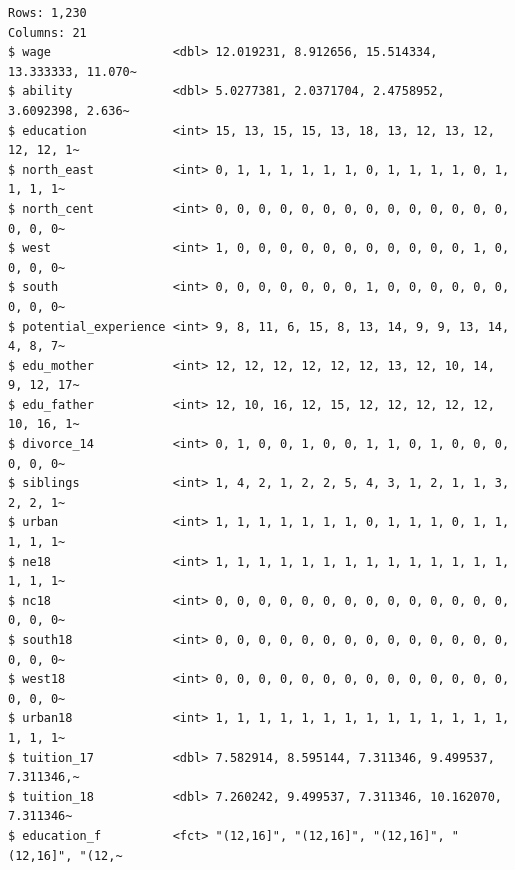 \documentclass[
  letterpaper,
  DIV=11,
  numbers=noendperiod]{scrreprt}
\begin{document}
\begin{verbatim}
Rows: 1,230
Columns: 21
$ wage                 <dbl> 12.019231, 8.912656, 15.514334, 13.333333, 11.070~
$ ability              <dbl> 5.0277381, 2.0371704, 2.4758952, 3.6092398, 2.636~
$ education            <int> 15, 13, 15, 15, 13, 18, 13, 12, 13, 12, 12, 12, 1~
$ north_east           <int> 0, 1, 1, 1, 1, 1, 1, 0, 1, 1, 1, 1, 0, 1, 1, 1, 1~
$ north_cent           <int> 0, 0, 0, 0, 0, 0, 0, 0, 0, 0, 0, 0, 0, 0, 0, 0, 0~
$ west                 <int> 1, 0, 0, 0, 0, 0, 0, 0, 0, 0, 0, 0, 1, 0, 0, 0, 0~
$ south                <int> 0, 0, 0, 0, 0, 0, 0, 1, 0, 0, 0, 0, 0, 0, 0, 0, 0~
$ potential_experience <int> 9, 8, 11, 6, 15, 8, 13, 14, 9, 9, 13, 14, 4, 8, 7~
$ edu_mother           <int> 12, 12, 12, 12, 12, 12, 13, 12, 10, 14, 9, 12, 17~
$ edu_father           <int> 12, 10, 16, 12, 15, 12, 12, 12, 12, 12, 10, 16, 1~
$ divorce_14           <int> 0, 1, 0, 0, 1, 0, 0, 1, 1, 0, 1, 0, 0, 0, 0, 0, 0~
$ siblings             <int> 1, 4, 2, 1, 2, 2, 5, 4, 3, 1, 2, 1, 1, 3, 2, 2, 1~
$ urban                <int> 1, 1, 1, 1, 1, 1, 1, 0, 1, 1, 1, 0, 1, 1, 1, 1, 1~
$ ne18                 <int> 1, 1, 1, 1, 1, 1, 1, 1, 1, 1, 1, 1, 1, 1, 1, 1, 1~
$ nc18                 <int> 0, 0, 0, 0, 0, 0, 0, 0, 0, 0, 0, 0, 0, 0, 0, 0, 0~
$ south18              <int> 0, 0, 0, 0, 0, 0, 0, 0, 0, 0, 0, 0, 0, 0, 0, 0, 0~
$ west18               <int> 0, 0, 0, 0, 0, 0, 0, 0, 0, 0, 0, 0, 0, 0, 0, 0, 0~
$ urban18              <int> 1, 1, 1, 1, 1, 1, 1, 1, 1, 1, 1, 1, 1, 1, 1, 1, 1~
$ tuition_17           <dbl> 7.582914, 8.595144, 7.311346, 9.499537, 7.311346,~
$ tuition_18           <dbl> 7.260242, 9.499537, 7.311346, 10.162070, 7.311346~
$ education_f          <fct> "(12,16]", "(12,16]", "(12,16]", "(12,16]", "(12,~
\end{verbatim}
\end{document}
